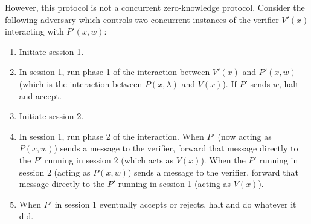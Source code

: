 \documentclass[draft]{article}
\begin{document}
\begin{enumerate}
  However, this protocol is not a concurrent zero-knowledge protocol.
  Consider the following adversary which controls two concurrent instances of the verifier $V'(x)$ interacting with $P'(x, w)$:
  \begin{enumerate}
  \item Initiate session 1.
  \item
    In session 1, run phase 1 of the interaction between $V'(x)$ and $P'(x, w)$ (which is the interaction between $P(x, \lambda)$ and $V(x)$).
    If $P'$ sends $w$, halt and accept.
  \item Initiate session 2.
  \item 
    In session 1, run phase 2 of the interaction.
    When $P'$ (now acting as $P(x, w)$) sends a message to the verifier, forward that message directly to the $P'$ running in session 2 (which acts as $V(x)$).
    When the $P'$ running in session 2 (acting as $P(x, w)$) sends a message to the verifier, forward that message directly to the $P'$ running in session 1 (acting as $V(x)$).
  \item When $P'$ in session 1 eventually accepts or rejects, halt and do whatever it did.
  \end{enumerate}
\end{enumerate}
\end{document}
